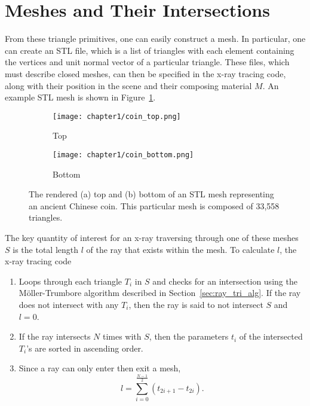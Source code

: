 \section{Meshes and Their Intersections}
From these triangle primitives, one can easily construct a mesh. In particular, one can create an STL file, which is a list of triangles with each element containing the vertices and unit normal vector of a particular triangle. These files, which must describe closed meshes, can then be specified in the x-ray tracing code, along with their position in the scene and their composing material $M$. An example STL mesh is shown in Figure~\ref{fig:coin_mesh_render}.

\begin{figure}[htb!]
  \centering
  \begin{subfigure}[b]{0.45\textwidth}
      \texttt{[image: chapter1/coin\_top.png]}
      \caption{Top}
  \end{subfigure}
  \hfill %
  \begin{subfigure}[b]{0.45\textwidth}
      \texttt{[image: chapter1/coin\_bottom.png]}
      \caption{Bottom}
  \end{subfigure}
  \caption{The rendered (a) top and (b) bottom of an STL mesh representing an ancient Chinese coin. This particular mesh is composed of 33,558 triangles.}
  \label{fig:coin_mesh_render}
\end{figure}

The key quantity of interest for an x-ray traversing through one of these meshes $S$ is the total length $l$ of the ray that exists within the mesh. To calculate $l$, the x-ray tracing code

\begin{enumerate}
  \item Loops through each triangle $T_i$ in $S$ and checks for an intersection using the Möller-Trumbore algorithm described in Section~\ref{sec:ray_tri_alg}. If the ray does not intersect with any $T_i$, then the ray is said to not intersect $S$ and $l=0$.
  \item If the ray intersects $N$ times with $S$, then the parameters $t_i$ of the intersected $T_i$'s are sorted in ascending order. 
  \item Since a ray can only enter then exit a mesh, 
  \begin{equation}
    l = \sum_{i=0}^{\frac{N-1}{2}} (t_{2i+1} - t_{2i}).
    \label{eq:l_for_M}
  \end{equation}
\end{enumerate}

